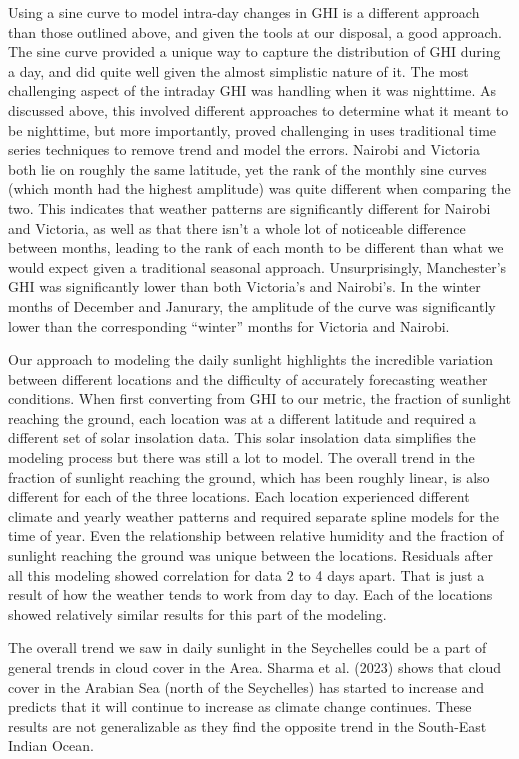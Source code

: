 \documentclass[
  letterpaper,
  DIV=11,
  numbers=noendperiod]{scrartcl}
\begin{document}
Using a sine curve to model intra-day changes in GHI is a different
approach than those outlined above, and given the tools at our disposal,
a good approach. The sine curve provided a unique way to capture the
distribution of GHI during a day, and did quite well given the almost
simplistic nature of it. The most challenging aspect of the intraday GHI
was handling when it was nighttime. As discussed above, this involved
different approaches to determine what it meant to be nighttime, but
more importantly, proved challenging in uses traditional time series
techniques to remove trend and model the errors. Nairobi and Victoria
both lie on roughly the same latitude, yet the rank of the monthly sine
curves (which month had the highest amplitude) was quite different when
comparing the two. This indicates that weather patterns are
significantly different for Nairobi and Victoria, as well as that there
isn't a whole lot of noticeable difference between months, leading to
the rank of each month to be different than what we would expect given a
traditional seasonal approach. Unsurprisingly, Manchester's GHI was
significantly lower than both Victoria's and Nairobi's. In the winter
months of December and Janurary, the amplitude of the curve was
significantly lower than the corresponding ``winter'' months for
Victoria and Nairobi.

Our approach to modeling the daily sunlight highlights the incredible
variation between different locations and the difficulty of accurately
forecasting weather conditions. When first converting from GHI to our
metric, the fraction of sunlight reaching the ground, each location was
at a different latitude and required a different set of solar insolation
data. This solar insolation data simplifies the modeling process but
there was still a lot to model. The overall trend in the fraction of
sunlight reaching the ground, which has been roughly linear, is also
different for each of the three locations. Each location experienced
different climate and yearly weather patterns and required separate
spline models for the time of year. Even the relationship between
relative humidity and the fraction of sunlight reaching the ground was
unique between the locations. Residuals after all this modeling showed
correlation for data 2 to 4 days apart. That is just a result of how the
weather tends to work from day to day. Each of the locations showed
relatively similar results for this part of the modeling.

The overall trend we saw in daily sunlight in the Seychelles could be a
part of general trends in cloud cover in the Area. Sharma et al. (2023)
shows that cloud cover in the Arabian Sea (north of the Seychelles) has
started to increase and predicts that it will continue to increase as
climate change continues. These results are not generalizable as they
find the opposite trend in the South-East Indian Ocean.
\end{document}
